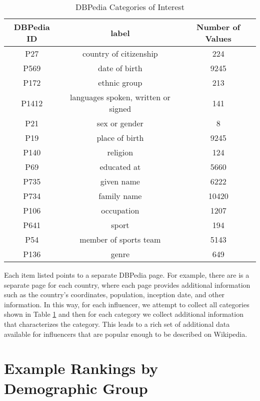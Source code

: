 \begin{table}
\small
\caption{DBPedia Categories of Interest}
\label{table_3_app2}
\begin{center}
\begin{tabular}{|c|c|c|}
\hline
\bfseries DBPedia ID & \bfseries label & \bfseries Number of Values\\
\hline
P27 & country of citizenship & 224\\
\hline
P569 & date of birth & 9245\\
\hline
P172 & ethnic group & 213\\
\hline
P1412 & languages spoken, written or signed & 141\\
\hline
P21 & sex or gender & 8\\
\hline
P19 & place of birth & 9245\\
\hline
P140 & religion & 124\\
\hline
P69 & educated at & 5660\\
\hline
P735 & given name & 6222\\
\hline
P734 & family name & 10420\\
\hline
P106 & occupation & 1207\\
\hline
P641 & sport & 194\\
\hline
P54 & member of sports team & 5143\\
\hline
P136 & genre & 649\\
\hline
\end{tabular}
\end{center}
\end{table}

Each item listed points to a separate DBPedia page. For example, there are is a separate page for each country, where each page provides additional information such as the country's coordinates, population, inception date, and other information. In this way, for each influencer, we attempt to collect all categories shown in Table \ref{table_3_app2} and then for each category we collect additional information that characterizes the category. This leads to a rich set of additional data available for influencers that are popular enough to be described on Wikipedia. %

\section{Example Rankings by Demographic Group}

